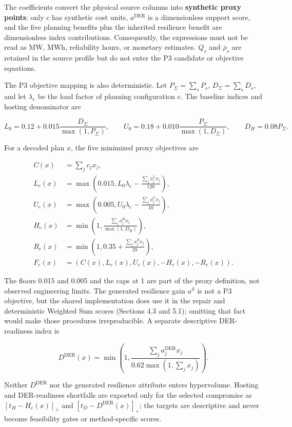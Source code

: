 \documentclass[energies,article,submit,moreauthors]{Definitions/mdpi}
\begin{document}
The coefficients convert the physical source columns into \textbf{synthetic proxy points}: only \(c\) has synthetic cost units, \(a^{\mathrm{DER}}\) is a dimensionless support score, and the five planning benefits plus the inherited resilience benefit are dimensionless index contributions. Consequently, the expressions must not be read as MW, MWh, reliability hours, or monetary estimates. \(Q_s\) and \(\bar\rho_s\) are retained in the source profile but do not enter the P3 candidate or objective equations.

The P3 objective mapping is also deterministic. Let \(P_\Sigma=\sum_sP_s\), \(D_\Sigma=\sum_sD_s\), and let \(\lambda_e\) be the load factor of planning configuration \(e\). The baseline indices and hosting denominator are

\[
L_0=0.12+0.015\frac{D_\Sigma}{\max(1,P_\Sigma)},\qquad
U_0=0.18+0.010\frac{P_\Sigma}{\max(1,D_\Sigma)},\qquad
D_H=0.08P_\Sigma.
\]

For a decoded plan \(x\), the five minimized proxy objectives are

\[
\begin{aligned}
C(x)&=\sum_j c_jx_j,\\
L_e(x)&=\max\!\left(0.015,L_0\lambda_e-\frac{\sum_j a_j^Lx_j}{120}\right),\\
U_e(x)&=\max\!\left(0.005,U_0\lambda_e-\frac{\sum_j a_j^Ux_j}{10}\right),\\
H_e(x)&=\min\!\left(1,\frac{\sum_j a_j^Hx_j}{\max(1,D_H)}\right),\\
R_e(x)&=\min\!\left(1,0.35+\frac{\sum_j a_j^Rx_j}{28}\right),\\
F_e(x)&=(C(x),L_e(x),U_e(x),-H_e(x),-R_e(x)).
\end{aligned}
\]

The floors 0.015 and 0.005 and the caps at 1 are part of the proxy definition, not observed engineering limits. The generated resilience gain \(a^S\) is not a P3 objective, but the shared implementation does use it in the repair and deterministic Weighted Sum scores (Sections 4.3 and 5.1); omitting that fact would make those procedures irreproducible. A separate descriptive DER-readiness index is

\[
D^{\mathrm{DER}}(x)=\min\!\left(1,
\frac{\sum_j a_j^{\mathrm{DER}}x_j}{0.62\max(1,\sum_jx_j)}\right).
\]

Neither \(D^{\mathrm{DER}}\) nor the generated resilience attribute enters hypervolume. Hosting and DER-readiness shortfalls are exported only for the selected compromise as \([t_H-H_e(x)]_+\) and \([t_D-D^{\mathrm{DER}}(x)]_+\); the targets are descriptive and never become feasibility gates or method-specific scores.
\end{document}
